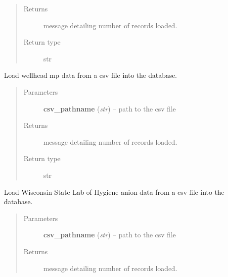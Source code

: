 \documentclass[letterpaper,10pt,english]{sphinxmanual}
\begin{document}
\begin{fulllineitems}
\begin{fulllineitems}
\begin{quote}
\begin{description}
\item[{Returns}] \leavevmode
message detailing number of records loaded.

\item[{Return type}] \leavevmode
str

\end{description}\end{quote}

\end{fulllineitems}


\begin{fulllineitems}
\label{modules:webb_utils.upload_data.UploadData.load_wellhead_mp_data}
Load wellhead mp data from a csv file into the database.
\begin{quote}\begin{description}
\item[{Parameters}] \leavevmode
\textbf{csv\_pathname} (\emph{str}) -- path to the csv file

\item[{Returns}] \leavevmode
message detailing number of records loaded.

\item[{Return type}] \leavevmode
str

\end{description}\end{quote}

\end{fulllineitems}


\begin{fulllineitems}
\label{modules:webb_utils.upload_data.UploadData.load_wslh_anion_data}
Load Wisconsin State Lab of Hygiene anion data from a csv file into the database.
\begin{quote}\begin{description}
\item[{Parameters}] \leavevmode
\textbf{csv\_pathname} (\emph{str}) -- path to the csv file

\item[{Returns}] \leavevmode
message detailing number of records loaded.


\end{description}
\end{quote}
\end{fulllineitems}
\end{fulllineitems}
\end{document}
